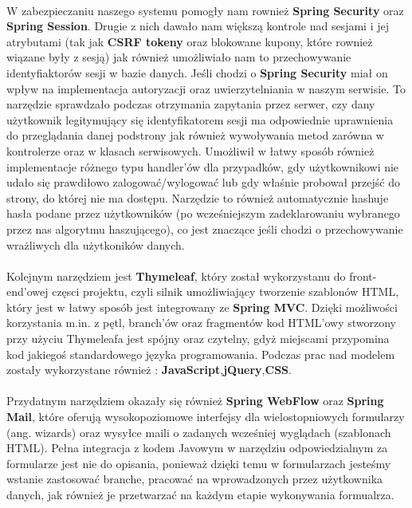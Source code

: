\paragraph{}
W zabezpieczaniu naszego systemu pomogły nam rownież \textbf{Spring Security} oraz \textbf{Spring Session}. Drugie z nich dawało nam większą kontrole nad sesjami i jej atrybutami (tak jak \textbf{CSRF tokeny} oraz blokowane kupony, które rownież wiązane były z sesją) jak również umożliwiało nam to przechowywanie identyfiaktorów sesji w bazie danych. Jeśli chodzi o \textbf{Spring Security} miał on wpływ na implementacja autoryzacji oraz uwierzytelniania w naszym serwisie. To narzędzie sprawdzało podczas otrzymania zapytania przez serwer, czy dany użytkownik legitymujący się identyfikatorem sesji ma odpowiednie uprawnienia do przeglądania danej podstrony jak również wywoływania metod zarówna w kontrolerze oraz w klasach serwisowych. Umożliwił w łatwy sposób również implementacje różnego typu handler'ów dla przypadków, gdy użytkownikowi nie udało się prawdiłowo zalogować/wylogować lub gdy właśnie probował przejść do strony, do której nie ma dostępu. Narzędzie to również automatycznie hashuje hasła podane przez użytkowników (po wcześniejszym zadeklarowaniu wybranego przez nas algorytmu haszującego), co jest znaczące jeśli chodzi o przechowywanie wrażliwych dla użytkoników danych.

\paragraph{}
Kolejnym narzędziem jest \textbf{Thymeleaf}, który został wykorzystanu do front-end'owej częsci projektu, czyli silnik umożliwiający tworzenie szablonów HTML, który jest w łatwy sposób jest integrowany ze \textbf{Spring MVC}.  Dzięki możliwości korzystania m.in. z pętl, branch'ów oraz fragmentów kod HTML'owy stworzony przy użyciu Thymeleafa jest spójny oraz czytelny, gdyż miejscami przypomina kod jakiegoś standardowego języka programowania. Podczas prac nad modelem zostały wykorzystane również : \textbf{JavaScript},\textbf{jQuery},\textbf{CSS}.

\paragraph{}
Przydatnym narzędziem okazały się również \textbf{Spring WebFlow} oraz \textbf{Spring Mail}, które oferują wysokopoziomowe interfejsy dla wielostopniowych formularzy (ang. wizards) oraz wysyłce maili o zadanych wcześniej wyglądach (szablonach HTML). Pełna integracja z kodem Javowym w narzędziu odpowiedzialnym za formularze jest nie do opisania, ponieważ dzięki temu w formularzach jesteśmy wstanie zastosować branche, pracować na wprowadzonych przez użytkownika danych, jak również je przetwarzać na każdym etapie wykonywania formualrza.

